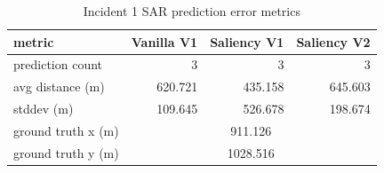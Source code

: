 \begin{table}[ht]
\centering
\caption{Incident 1 SAR prediction error metrics}
\label{tab:sar-incident-1}
\begin{tabular}{lrrr}
\hline
metric & Vanilla V1 & Saliency V1 & Saliency V2 \\
\hline
prediction count & 3 & 3 & 3 \\
avg distance (m) & 620.721 & 435.158 & 645.603 \\
stddev (m) & 109.645 & 526.678 & 198.674 \\
ground truth x (m) & \multicolumn{3}{c}{911.126} \\
ground truth y (m) & \multicolumn{3}{c}{1028.516} \\
\hline
\end{tabular}
\end{table}
